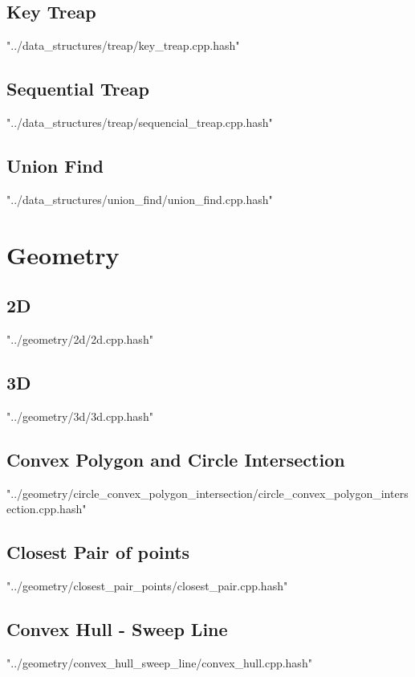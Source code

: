 \documentclass [a4paper,5pt,oneside, landscape]{article}
\begin{document}
\begin{multicols}{3}
\subsection{ Key Treap}
 {"../data_structures/treap/key_treap.cpp.hash"}


\subsection{ Sequential Treap}
 {"../data_structures/treap/sequencial_treap.cpp.hash"}


\subsection{ Union Find}
 {"../data_structures/union_find/union_find.cpp.hash"}



\section{Geometry}
\subsection{ 2D}
 {"../geometry/2d/2d.cpp.hash"}


\subsection{ 3D}
 {"../geometry/3d/3d.cpp.hash"}


\subsection{ Convex Polygon and Circle Intersection}
 {"../geometry/circle_convex_polygon_intersection/circle_convex_polygon_intersection.cpp.hash"}


\subsection{ Closest Pair of points}
 {"../geometry/closest_pair_points/closest_pair.cpp.hash"}


\subsection{ Convex Hull - Sweep Line}
 {"../geometry/convex_hull_sweep_line/convex_hull.cpp.hash"}



\end{multicols}
\end{document}
